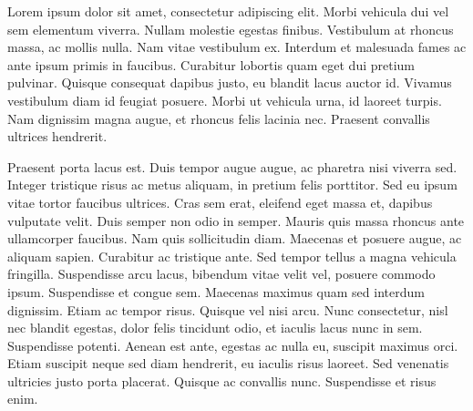 \pg
Lorem ipsum dolor sit amet, consectetur adipiscing elit. Morbi vehicula dui vel sem elementum viverra. Nullam molestie egestas finibus. Vestibulum at rhoncus massa, ac mollis nulla. Nam vitae vestibulum ex. Interdum et malesuada fames ac ante ipsum primis in faucibus. Curabitur lobortis quam eget dui pretium pulvinar. Quisque consequat dapibus justo, eu blandit lacus auctor id. Vivamus vestibulum diam id feugiat posuere. Morbi ut vehicula urna, id laoreet turpis. Nam dignissim magna augue, et rhoncus felis lacinia nec. Praesent convallis ultrices hendrerit.

\pg
Praesent porta lacus est. Duis tempor augue augue, ac pharetra nisi viverra sed. Integer tristique risus ac metus aliquam, in pretium felis porttitor. Sed eu ipsum vitae tortor faucibus ultrices. Cras sem erat, eleifend eget massa et, dapibus vulputate velit. Duis semper non odio in semper. Mauris quis massa rhoncus ante ullamcorper faucibus. Nam quis sollicitudin diam. Maecenas et posuere augue, ac aliquam sapien. Curabitur ac tristique ante. Sed tempor tellus a magna vehicula fringilla. Suspendisse arcu lacus, bibendum vitae velit vel, posuere commodo ipsum. Suspendisse et congue sem. Maecenas maximus quam sed interdum dignissim. Etiam ac tempor risus. Quisque vel nisi arcu. Nunc consectetur, nisl nec blandit egestas, dolor felis tincidunt odio, et iaculis lacus nunc in sem. Suspendisse potenti. Aenean est ante, egestas ac nulla eu, suscipit maximus orci. Etiam suscipit neque sed diam hendrerit, eu iaculis risus laoreet. Sed venenatis ultricies justo porta placerat. Quisque ac convallis nunc. Suspendisse et risus enim.
